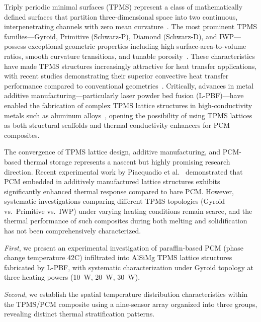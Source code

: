 Triply periodic minimal surfaces (TPMS) represent a class of mathematically defined surfaces that partition three-dimensional space into two continuous, interpenetrating channels with zero mean curvature~\cite{jung2006fluid,himmelmann2026amorphous}. The most prominent TPMS families---Gyroid, Primitive (Schwarz-P), Diamond (Schwarz-D), and IWP---possess exceptional geometric properties including high surface-area-to-volume ratios, smooth curvature transitions, and tunable porosity~\cite{tang2023analysis,kaur2021flow,barakat2024controlling}. These characteristics have made TPMS structures increasingly attractive for heat transfer applications, with recent studies demonstrating their superior convective heat transfer performance compared to conventional geometries~\cite{tang2023experimental,renon2025numerical,chen2026comprehensive}. Critically, advances in metal additive manufacturing---particularly laser powder bed fusion (L-PBF)---have enabled the fabrication of complex TPMS lattice structures in high-conductivity metals such as aluminum alloys~\cite{catchpole2019thermal,chouhan2025heat,fouad2026additive,noronha2025thin}, opening the possibility of using TPMS lattices as both structural scaffolds and thermal conductivity enhancers for PCM composites.

The convergence of TPMS lattice design, additive manufacturing, and PCM-based thermal storage represents a nascent but highly promising research direction. Recent experimental work by Piacquadio et al.~\cite{piacquadio2022experimental} demonstrated that PCM embedded in additively manufactured lattice structures exhibits significantly enhanced thermal response compared to bare PCM. However, systematic investigations comparing different TPMS topologies (Gyroid vs.\ Primitive vs.\ IWP) under varying heating conditions remain scarce, and the thermal performance of such composites during both melting and solidification has not been comprehensively characterized.

\emph{First}, we present an experimental investigation of paraffin-based PCM (phase change temperature 42\textdegree C) infiltrated into AlSiMg TPMS lattice structures fabricated by L-PBF, with systematic characterization under Gyroid topology at three heating powers (10~W, 20~W, 30~W).

\emph{Second}, we establish the spatial temperature distribution characteristics within the TPMS/PCM composite using a nine-sensor array organized into three groups, revealing distinct thermal stratification patterns.

